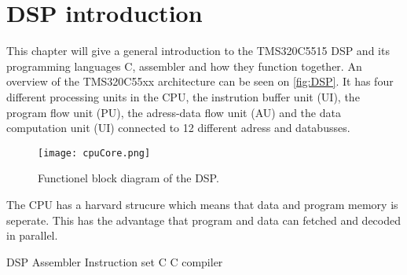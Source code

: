 \chapter{DSP introduction}
This chapter will give a general introduction to the TMS320C5515 DSP and its programming languages C, assembler and how they function together. An overview of the TMS320C55xx architecture can be seen on \autoref{fig:DSP}. It has four different processing units in the CPU, the instrution buffer unit (UI), the program flow unit (PU), the adress-data flow unit (AU) and the data computation unit (UI) connected to 12 different adress and databusses.  
 
\begin{figure}[H]
\centering
\texttt{[image: cpuCore.png]}
\label{fig:DSP}
\caption{Functionel block diagram of the DSP.}
\end{figure}

The CPU has a harvard strucure which means that data and program memory is seperate. This has the advantage that program and data can fetched and decoded in parallel. 

DSP
Assembler
Instruction set
C
C compiler 
